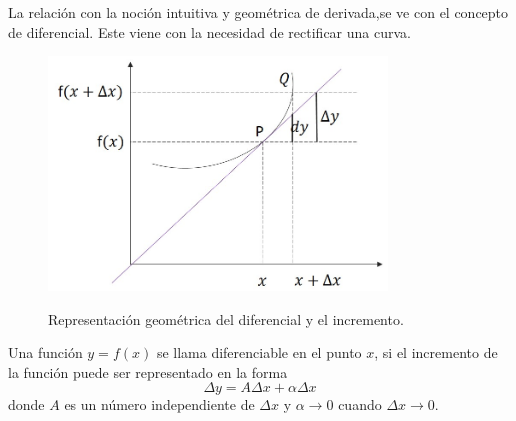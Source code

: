 \documentclass[10pt,twoside]{SelfArx} %
\begin{document}
  
  
  
  
  La relación con la noción intuitiva y geométrica de derivada,se ve con el concepto de diferencial. 
  Este viene con la necesidad de rectificar una curva.\\
\begin{figure}[h]
	\centering
	\includegraphics[width=9cm]{curva_diferencial}
	\label{curva_diferencial}
	\caption{Representación geométrica del diferencial y el incremento.}
\end{figure}
\begin{thm}
	Una función $ y=f(x) $ se llama diferenciable en el punto $ x $, si el incremento de la función puede ser representado en la forma
	\begin{equation}
	\Delta y=A\Delta x+\alpha\Delta x\label{diferencial}
	\end{equation}
	donde $ A $ es un número independiente de $ \Delta x $ y $ \alpha\rightarrow0 $ cuando $ \Delta x\rightarrow0 $.
\end{thm}  
\end{document}

